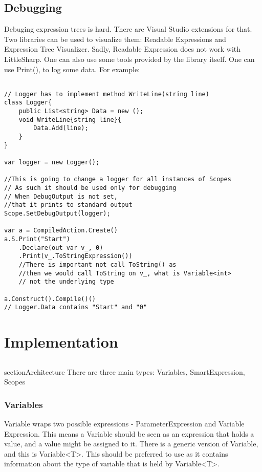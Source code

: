 \subsection{Debugging}
Debuging expression trees is hard. There are Visual Studio extensions for that. Two libraries can be used to visualize them: Readable Expressions and Expression Tree Visualizer. \cite{ExpressDebug} 
Sadly, Readable Expression does not work with LittleSharp. One can also use some tools provided by the library itself. One can use Print(), to log some data. For example:
\begin{lstlisting}

// Logger has to implement method WriteLine(string line)
class Logger{
    public List<string> Data = new ();
    void WriteLine{string line}{
        Data.Add(line);
    }
}

var logger = new Logger();

//This is going to change a logger for all instances of Scopes
// As such it should be used only for debugging
// When DebugOutput is not set, 
//that it prints to standard output
Scope.SetDebugOutput(logger);

var a = CompiledAction.Create()
a.S.Print("Start")
    .Declare(out var v_, 0)
    .Print(v_.ToStringExpression())
    //There is important not call ToString() as 
    //then we would call ToString on v_, what is Variable<int>
    // not the underlying type

a.Construct().Compile()()
// Logger.Data contains "Start" and "0"
\end{lstlisting}


\section{Implementation}
\subsection{}section{Architecture}
There are three main types: Variables, SmartExpression, Scopes
\subsubsection{Variables}
Variable wraps two possible expressions - ParameterExpression and Variable Expression. This means a Variable should be seen as an expression that holds a value, and a value might be assigned to it. There is a generic version of Variable, and this is Variable<T>. This should be preferred to use as it contains information about the type of variable that is held by Variable<T>.



